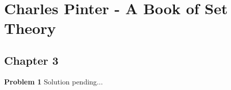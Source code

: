 \documentclass{article}
\begin{document}
\section*{Charles Pinter - A Book of Set Theory}
\subsection*{Chapter 3}

\textbf{Problem 1}
Solution pending...
\end{document}
